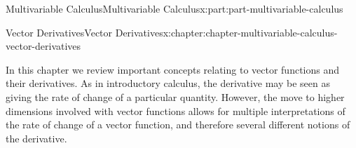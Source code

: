 \documentclass[twoside,10pt,]{book}
\numberwithin{equation}{part}
\begin{document}
\begin{partptx}{Multivariable Calculus}{}{Multivariable Calculus}{}{}{x:part:part-multivariable-calculus}
%
\typeout{************************************************}
\typeout{************************************************}
%
\begin{chapterptx}{Vector Derivatives}{}{Vector Derivatives}{}{}{x:chapter:chapter-multivariable-calculus-vector-derivatives}
\begin{introduction}{}%
In this chapter we review important concepts relating to vector functions and their derivatives. As in introductory calculus, the derivative may be seen as giving the rate of change of a particular quantity. However, the move to higher dimensions involved with vector functions allows for multiple interpretations of the rate of change of a vector function, and therefore several different notions of the derivative.%
\end{introduction}%
\end{chapterptx}
 \end{partptx}
%
\appendix%
%
\end{document}
